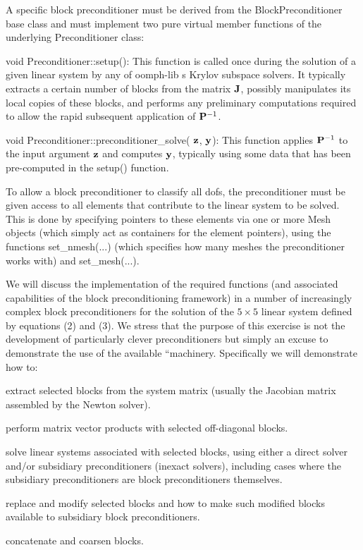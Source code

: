 A specific block preconditioner must be derived from the {\ttfamily Block\+Preconditioner} base class and must implement two pure virtual member functions of the underlying {\ttfamily Preconditioner} class\+:
\begin{DoxyItemize}
\item {\ttfamily void} {\ttfamily Preconditioner\+::setup()}\+: This function is called once during the solution of a given linear system by any of {\ttfamily oomph-\/lib} \textquotesingle{}s Krylov subspace solvers. It typically extracts a certain number of blocks from the matrix ${\bf J}$, possibly manipulates its local copies of these blocks, and performs any preliminary computations required to allow the rapid subsequent application of ${\bf P}^{-1}$.
\item {\ttfamily void} {\ttfamily Preconditioner\+::preconditioner\+\_\+solve}( $\bf{z}$, $\bf{y}$)\+: This function applies ${\bf P}^{-1}$ to the input argument ${\bf z}$ and computes ${\bf y}$, typically using some data that has been pre-\/computed in the {\ttfamily setup()} function.
\end{DoxyItemize}

To allow a block preconditioner to classify all dofs, the preconditioner must be given access to all elements that contribute to the linear system to be solved. This is done by specifying pointers to these elements via one or more {\ttfamily Mesh} objects (which simply act as containers for the element pointers), using the functions {\ttfamily set\+\_\+nmesh}(...) (which specifies how many meshes the preconditioner works with) and {\ttfamily set\+\_\+mesh}(...).

We will discuss the implementation of the required functions (and associated capabilities of the block preconditioning framework) in a number of increasingly complex block preconditioners for the solution of the $5 \times 5$ linear system defined by equations (2) and (3). We stress that the purpose of this exercise is not the development of particularly clever preconditioners but simply an excuse to demonstrate the use of the available ``machinery\textquotesingle{}\textquotesingle{}. Specifically we will demonstrate how to\+:


\begin{DoxyItemize}
\item extract selected blocks from the system matrix (usually the Jacobian matrix assembled by the Newton solver).
\item perform matrix vector products with selected off-\/diagonal blocks.
\item solve linear systems associated with selected blocks, using either a direct solver and/or subsidiary preconditioners (inexact solvers), including cases where the subsidiary preconditioners are block preconditioners themselves.
\item replace and modify selected blocks and how to make such modified blocks available to subsidiary block preconditioners.
\item concatenate and coarsen blocks.
\end{DoxyItemize}



